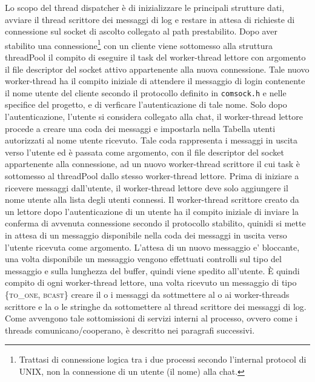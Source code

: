 \documentclass[a4paper,10pt]{article}
\begin{document}
Lo scopo del thread dispatcher \`e di inizializzare le principali
strutture dati, avviare il thread scrittore dei messaggi di log e
restare in attesa di richieste di connessione sul socket di ascolto
collegato al path prestabilito. Dopo aver stabilito una
connessione\footnote{Trattasi di connessione logica tra i due processi
  secondo l'internal protocol di UNIX, non la connessione di un utente
  (il nome) alla chat.} con un cliente viene sottomesso alla struttura
threadPool il compito di eseguire il task del worker-thread lettore
con argomento il file descriptor del socket attivo appartenente alla
nuova connessione. Tale nuovo worker-thread ha il compito iniziale di
attendere il messaggio di login contenente il nome utente del cliente
secondo il protocollo definito in \texttt{comsock.h} e nelle specifice
del progetto, e di verficare l'autenticazione di tale nome. Solo dopo
l'autenticazione, l'utente si considera collegato alla chat, il
worker-thread lettore procede a creare una coda dei messaggi e
impostarla nella Tabella utenti autorizzati al nome utente
ricevuto. Tale coda rappresenta i messaggi in uscita verso l'utente ed
\`e passata come argomento, con il file descriptor del socket
appartenente alla connessione, ad un nuovo worker-thread scrittore il
cui task \`e sottomesso al threadPool dallo stesso worker-thread
lettore. Prima di iniziare a ricevere messaggi dall'utente, il
worker-thread lettore deve solo aggiungere il nome utente alla lista
degli utenti connessi. Il worker-thread scrittore creato da un lettore
dopo l'autenticazione di un utente ha il compito iniziale di inviare
la conferma di avvenuta connessione secondo il protocollo stabilito,
quinidi si mette in attesa di un messaggio disponibile nella coda dei
messaggi in uscita verso l'utente ricevuta come argomento. L'attesa di
un nuovo messaggio e' bloccante, una volta disponibile un messaggio
vengono effettuati controlli sul tipo del messaggio e sulla lunghezza
del buffer, quindi viene spedito all'utente. \`E quindi compito di
ogni worker-thread lettore, una volta ricevuto un messaggio di tipo
\{\textsc{to\_one}, \textsc{bcast}\} creare il o i messaggi da
sottmettere al o ai worker-threads scrittore e la o le stringhe da
sottomettere al thread scrittore dei messaggi di log. Come avvengono
tale sottomissioni di servizi interni al processo, ovvero come i
threads comunicano/cooperano, \`e descritto nei paragrafi successivi.
\end{document}
